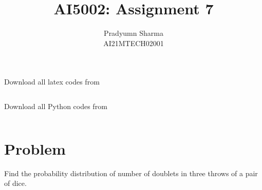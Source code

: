 \documentclass[journal,12pt,twocolumn]{IEEEtran}
\begin{document}
     \def\rightbox#1{\makebox[0in][r]{#1}}
     \def\centbox#1{\makebox[0in]{#1}}
     \def\topbox#1{\raisebox{-\baselineskip}[0in][0in]{#1}}
     \def\midbox#1{\raisebox{-0.5\baselineskip}[0in][0in]{#1}}
\vspace{3cm}
\title{AI5002: Assignment 7}
\author{Pradyumn Sharma\\ AI21MTECH02001}
\maketitle
\newpage
\bigskip
\renewcommand{\thefigure}{\theenumi}
\renewcommand{\thetable}{\theenumi}
Download all latex codes from 
%
\begin{lstlisting}

\end{lstlisting}
%
Download all Python codes from 
%
\begin{lstlisting}

\end{lstlisting}
%
\section{Problem}
Find the probability distribution of number of doublets in three throws of a pair of dice.
\end{document}
